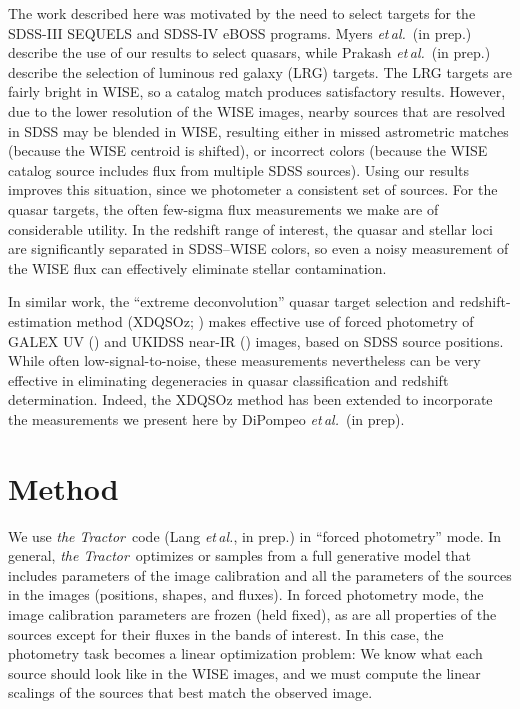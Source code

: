 \documentclass[12pt,preprint]{aastex}
\newcommand{\foreign}[1]{\emph{#1}}
\newcommand{\etal}{\foreign{et\,al.}}
\newcommand{\thetractor}{\textsl{the Tractor}}
\begin{document}
The work described here was motivated by the need to select targets
for the SDSS-III SEQUELS and SDSS-IV eBOSS programs.  Myers \etal\ (in
prep.) describe the use of our results to select quasars, while
Prakash \etal\ (in prep.) describe the selection of luminous red
galaxy (LRG) targets.  The LRG targets are fairly bright in WISE, so a
catalog match produces satisfactory results.  However, due to the
lower resolution of the WISE images, nearby sources that are resolved
in SDSS may be blended in WISE, resulting either in missed astrometric
matches (because the WISE centroid is shifted), or incorrect colors
(because the WISE catalog source includes flux from multiple SDSS
sources).  Using our results improves this situation, since we
photometer a consistent set of sources.  For the quasar targets, the
often few-sigma flux measurements we make are of considerable utility.
In the redshift range of interest, the quasar and stellar loci are
significantly separated in SDSS--WISE colors, so even a noisy
measurement of the WISE flux can effectively eliminate stellar
contamination.


In similar work, the ``extreme deconvolution'' quasar target selection
and redshift-estimation method (XDQSOz; \citealt{bovy}) makes
effective use of forced photometry of GALEX UV (\citealt{martin}) and
UKIDSS near-IR (\citealt{lawrence}) images, based on SDSS source
positions.  While often low-signal-to-noise, these measurements
nevertheless can be very effective in eliminating degeneracies in
quasar classification and redshift determination.  Indeed, the XDQSOz
method has been extended to incorporate the measurements we present
here by DiPompeo \etal\ (in prep).

\section{Method}

We use \thetractor\ code (Lang \etal, in prep.) in ``forced
photometry'' mode.  In general, \thetractor\ optimizes or samples from
a full generative model that includes parameters of the image
calibration and all the parameters of the sources in the images
(positions, shapes, and fluxes).  In forced photometry mode, the image
calibration parameters are frozen (held fixed), as are all properties of the
sources except for their fluxes in the bands of interest.  In this
case, the photometry task becomes a linear optimization problem:
We know what each source
should look like in the WISE images, and we must compute the linear scalings
of the sources that best match the observed image.
\end{document}
